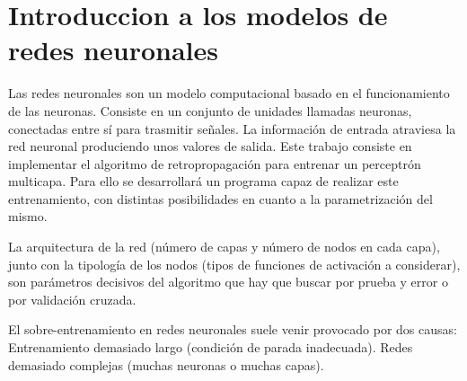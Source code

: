 \section{Introduccion a los modelos de redes neuronales}

Las redes neuronales son un modelo computacional basado en el funcionamiento de las neuronas. Consiste en un conjunto de unidades llamadas neuronas, conectadas entre sí para trasmitir señales. La información de entrada atraviesa la red neuronal produciendo unos valores de salida.
Este trabajo consiste en implementar el algoritmo de retropropagación para entrenar un perceptrón multicapa. Para ello se desarrollará un programa capaz de realizar este entrenamiento, con distintas posibilidades en cuanto a la parametrización del mismo. 

La arquitectura de la red (número de capas y número de
nodos en cada capa), junto con la tipología de los nodos
(tipos de funciones de activación a considerar), son
parámetros decisivos del algoritmo que hay que buscar por
prueba y error o por validación cruzada.

El sobre-entrenamiento en redes neuronales suele venir
provocado por dos causas:
Entrenamiento demasiado largo (condición de parada
inadecuada).
Redes demasiado complejas (muchas neuronas o muchas
capas).
